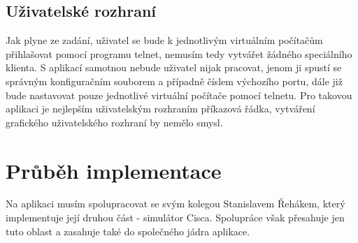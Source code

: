 \subsection{Uživatelské rozhraní}

Jak plyne ze zadání, uživatel se bude k jednotlivým virtuálním počítačům přihlašovat pomocí programu telnet, nemusím tedy vytvářet žádného speciálního klienta. S aplikací samotnou nebude uživatel nijak pracovat, jenom ji spustí se správným konfiguračním souborem a případně číslem výchozího portu, dále již bude nastavovat pouze jednotlivé virtuální počítače pomocí telnetu. Pro takovou aplikaci je nejlepším uživatelským rozhraním příkazová řádka, vytváření grafického uživatelského rozhraní by nemělo smysl.


\section{Průběh implementace}

Na aplikaci musím spolupracovat se svým kolegou Stanislavem Řehákem, který implementuje její druhou část - simulátor Cisca. Spolupráce však přesahuje jen tuto oblast a zasahuje také do společného jádra aplikace.



